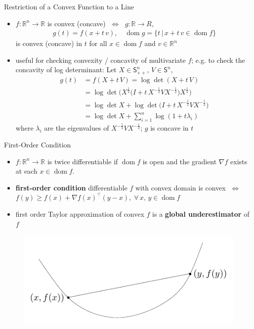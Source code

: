 \documentclass[10pt]{beamer}
\newcommand{\ds}{\displaystyle}
\newcommand{\ifff}{\;\Longleftrightarrow\;}
\DeclareMathOperator*{\dom}{dom}
\theoremstyle{definition}
\begin{document}
\begin{frame}{Restriction of a Convex Function to a Line}

\begin{itemize}
  \item $f:\mathbb{R}^n\to\mathbb{R}$ is convex (concave) $\ifff$ $g:\mathbb{R}\to R$, 
    \begin{align*}
      g(t) = f(x + t\,v), \quad\dom g = \{t\,|\, x+t\,v\in\dom f\}  
    \end{align*}
    is convex (concave) in $t$ for all $x\in\dom f$ and $v\in\mathbb{R}^n$
  \item useful for checking convexity / concavity of multivariate $f$; e.g. to check the concavity of log determinant: Let $X\in\mathsf{S}^n_{++}$, $V\in\mathsf{S}^n$,
    \begin{align*} 
      g(t) &= f(X + t\,V) = \log\det(X + t\,V) \\
           &= \log\det\big(X^{\frac{1}{2}}\big(I + t\,X^{-\frac{1}{2}}VX^{-\frac{1}{2}}\big)X^{\frac{1}{2}}\big) \\
           &= \log\det X + \log\det\big(I + t\,X^{-\frac{1}{2}}VX^{-\frac{1}{2}}\big) \\
           &= \log\det X + \sum_{i=1}^n\log(1 + t\lambda_i) 
         \end{align*}\vspace{-3em}
    where $\lambda_i$ are the eigenvalues of $\ds X^{-\frac{1}{2}}VX^{-\frac{1}{2}}$; $g$ is concave in $t$
\end{itemize}

\end{frame}

\begin{frame}{First-Order Condition}

\begin{itemize}
  \item $f:\mathbb{R}^n\to\mathbb{R}$ is twice differentiable if $\dom f$ is open and the gradient $\nabla f$ exists at each $x\in\dom f$.
  \item {\bf first-order condition} differentiable $f$ with convex domain is convex $\ifff$ $\ds f(y) \geqslant f(x) + \nabla f(x)^\top(y - x),\;\forall\,x,\,y\in\dom f$
  \item first order Taylor approximation of convex $f$ is a {\bf global underestimator} of $f$
\end{itemize}
\begin{figure}[!htbp]
  \centering
  \includegraphics[scale=1,page=2]{fig/note06/03.pdf}
\end{figure}

\end{frame}
\end{document}
